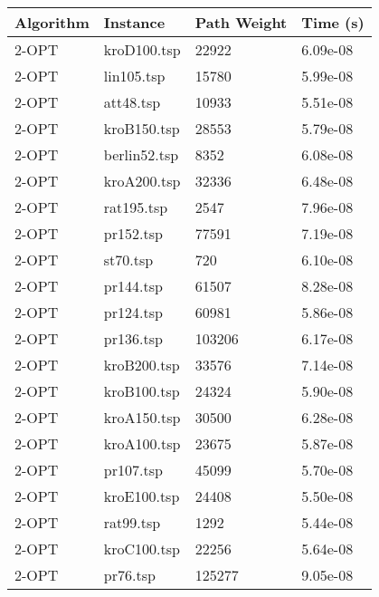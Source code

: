 \documentclass{article}
\begin{document}
\begin{center}

	\begin{table}[ht]
		\centering
		\begin{tabular}{llll}
			\toprule
			\textbf{Algorithm} & \textbf{Instance} & \textbf{Path Weight} & \textbf{Time (s)} \\
			\midrule
			2-OPT              & kroD100.tsp       & 22922                & 6.09e-08          \\
			2-OPT              & lin105.tsp        & 15780                & 5.99e-08          \\
			2-OPT              & att48.tsp         & 10933                & 5.51e-08          \\
			2-OPT              & kroB150.tsp       & 28553                & 5.79e-08          \\
			2-OPT              & berlin52.tsp      & 8352                 & 6.08e-08          \\
			2-OPT              & kroA200.tsp       & 32336                & 6.48e-08          \\
			2-OPT              & rat195.tsp        & 2547                 & 7.96e-08          \\
			2-OPT              & pr152.tsp         & 77591                & 7.19e-08          \\
			2-OPT              & st70.tsp          & 720                  & 6.10e-08          \\
			2-OPT              & pr144.tsp         & 61507                & 8.28e-08          \\
			2-OPT              & pr124.tsp         & 60981                & 5.86e-08          \\
			2-OPT              & pr136.tsp         & 103206               & 6.17e-08          \\
			2-OPT              & kroB200.tsp       & 33576                & 7.14e-08          \\
			2-OPT              & kroB100.tsp       & 24324                & 5.90e-08          \\
			2-OPT              & kroA150.tsp       & 30500                & 6.28e-08          \\
			2-OPT              & kroA100.tsp       & 23675                & 5.87e-08          \\
			2-OPT              & pr107.tsp         & 45099                & 5.70e-08          \\
			2-OPT              & kroE100.tsp       & 24408                & 5.50e-08          \\
			2-OPT              & rat99.tsp         & 1292                 & 5.44e-08          \\
			2-OPT              & kroC100.tsp       & 22256                & 5.64e-08          \\
			2-OPT              & pr76.tsp          & 125277               & 9.05e-08          \\
			\bottomrule
		\end{tabular}
	\end{table}

\end{center}
\end{document}
